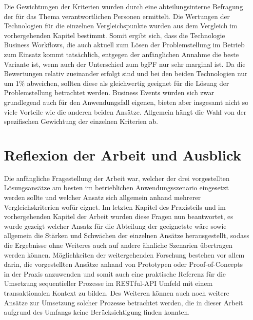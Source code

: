 Die Gewichtungen der Kriterien wurden durch eine abteilungsinterne Befragung der für das Thema verantwortlichen Personen ermittelt. Die Wertungen der Technologien für die einzelnen Vergleichspunkte wurden aus dem Vergleich im vorhergehenden Kapitel bestimmt. Somit ergibt sich, dass die Technologie Business Workflows, die auch aktuell zum Lösen der Problemstellung im Betrieb zum Einsatz kommt tatsächlich, entgegen der anfänglichen Annahme die beste Variante ist, wenn auch der Unterschied zum bgPF nur sehr marginal ist. Da die Bewertungen relativ zueinander erfolgt sind und bei den beiden Technologien nur um 1\% abweichen, sollten diese als gleichwertig geeignet für die Lösung der Problemstellung betrachtet werden. Business Events würden sich zwar grundlegend auch für den Anwendungsfall eigenen, bieten aber insgesamt nicht so viele Vorteile wie die anderen beiden Ansätze. Allgemein hängt die Wahl von der spezifischen Gewichtung der einzelnen Kriterien ab. 

\section{Reflexion der Arbeit und Ausblick}

Die anfängliche Fragestellung der Arbeit war, welcher der drei vorgestellten Lösungsansätze am besten im betrieblichen Anwendungsszenario eingesetzt werden sollte und welcher Ansatz sich allgemein anhand mehrerer Vergleichskriterien wofür eignet. Im letzten Kapitel des Praxisteils und im vorhergehenden Kapitel der Arbeit wurden diese Fragen nun beantwortet, es wurde gezeigt welcher Ansatz für die Abteilung der geeignetste wäre sowie allgemein die Stärken und Schwächen der einzelnen Ansätze herausgestellt, sodass die Ergebnisse ohne Weiteres auch auf andere ähnliche Szenarien übertragen werden können. Möglichkeiten der weitergehenden Forschung bestehen vor allem darin, die vorgestellten Ansätze anhand von Prototypen oder Proof-of-Concepts in der Praxis anzuwenden und somit auch eine praktische Referenz für die Umsetzung sequentieller Prozesse im RESTful-API Umfeld mit einem transaktionalen Kontext zu bilden. Des Weiteren können auch noch weitere Ansätze zur Umsetzung solcher Prozesse betrachtet werden, die in dieser Arbeit aufgrund des Umfangs keine Berücksichtigung finden konnten.